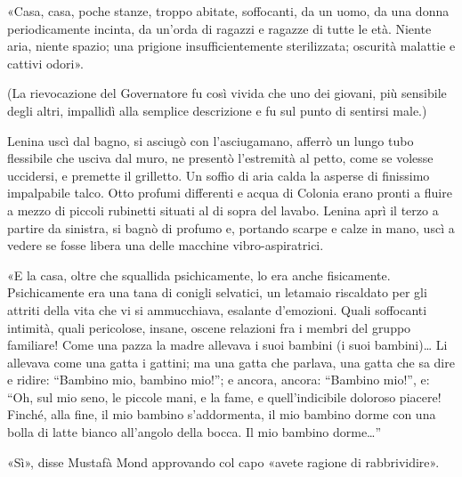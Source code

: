 \documentclass[
a5paper, %
10pt, %
twoside, 
onecolumn, %
openany, %
]{memoir}
\renewenvironment{shaded}{%
  \def\FrameCommand{\fboxsep=\FrameSep \colorbox{shadecolor}}%
  \MakeFramed{\advance\hsize-\width \FrameRestore\FrameRestore}}%
 {\endMakeFramed}
\begin{document}
«Casa, casa, poche stanze, troppo abitate, soffocanti, da un uomo, da una donna periodicamente incinta, da un’orda di ragazzi e ragazze di tutte le età. Niente aria, niente spazio; una prigione insufficientemente sterilizzata; oscurità malattie e cattivi odori».

(La rievocazione del Governatore fu così vivida che uno dei giovani, più sensibile degli altri, impallidì alla semplice descrizione e fu sul punto di sentirsi male.)

\begin{shaded}
    Lenina uscì dal bagno, si asciugò con l’asciugamano, afferrò un lungo tubo flessibile che usciva dal muro, ne presentò l’estremità al petto, come se volesse uccidersi, e premette il grilletto. Un soffio di aria calda la asperse di finissimo impalpabile talco. Otto profumi differenti e acqua di Colonia erano pronti a fluire a mezzo di piccoli rubinetti situati al di sopra del lavabo. Lenina aprì il terzo a partire da sinistra, si bagnò di profumo e, portando scarpe e calze in mano, uscì a vedere se fosse libera una delle macchine vibro-aspiratrici.
\end{shaded}

«E la casa, oltre che squallida psichicamente, lo era anche fisicamente. Psichicamente era una tana di conigli selvatici, un letamaio riscaldato per gli attriti della vita che vi si ammucchiava, esalante d’emozioni. Quali soffocanti intimità, quali pericolose, insane, oscene relazioni fra i membri del gruppo familiare! Come una pazza la madre allevava i suoi bambini (i suoi bambini)… Li allevava come una gatta i gattini; ma una gatta che parlava, una gatta che sa dire e ridire: “Bambino mio, bambino mio!”; e ancora, ancora: “Bambino mio!”, e: “Oh, sul mio seno, le piccole mani, e la fame, e quell’indicibile doloroso piacere! Finché, alla fine, il mio bambino s’addormenta, il mio bambino dorme con una bolla di latte bianco all’angolo della bocca. Il mio bambino dorme…”

«Sì», disse Mustafà Mond approvando col capo «avete ragione di rabbrividire».
\end{document}
